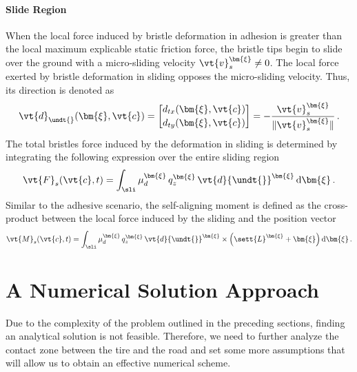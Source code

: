 \paragraph{Slide Region}

When the local force induced by bristle deformation in adhesion is greater than the local maximum explicable static friction force, the bristle tips begin to slide over the ground with a micro-sliding velocity $\vt{v}_s^{\bm{\xi}} \neq 0$. The local force exerted by bristle deformation in sliding opposes the micro-sliding velocity. Thus, its direction is denoted as
%
\begin{equation*}
  \vt{d}_{\undt{}}(\bm{\xi},\vt{c}) =
  \begin{bmatrix}
    d_{tx}(\bm{\xi},\vt{c}) \\[0.2em]
    d_{ty}(\bm{\xi},\vt{c})
  \end{bmatrix} = -\dfrac{\vt{v}_s^{\bm{\xi}}}{\|{\vt{v}_s^{\bm{\xi}}}\|} \, \text{.}
\end{equation*}
%
The total bristles force induced by the deformation in sliding is determined by integrating the following expression over the entire sliding region \sli{}
%
\begin{equation}
  \vt{F}_s(\vt{c},t) = \int_{\sli} \mu_d^{\bm{\xi}}\,q_z^{\bm{\xi}}\,\vt{d}{\undt{}}^{\bm{\xi}} \, \mathrm{d}\bm{\xi} \, \text{.}
  \label{app3:eq:F_s}
\end{equation}
%
Similar to the adhesive scenario, the self-aligning moment is defined as the cross-product between the local force induced by the sliding and the position vector
%
\begin{equation}
  \vt{M}_s(\vt{c},t) = \int_{\sli} \mu_d^{\bm{\xi}}\,q_z^{\bm{\xi}}\,\vt{d}{\undt{}}^{\bm{\xi}} \times \left(\sett{L}^{\bm{\xi}} + \bm{\xi}\right) \mathrm{d}\bm{\xi} \, \text{.}
  \label{app3:eq:M_s}
\end{equation}


\section{A Numerical Solution Approach}
\label{app3:sec:numerical_solution}

Due to the complexity of the problem outlined in the preceding sections, finding an analytical solution is not feasible. Therefore, we need to further analyze the contact zone between the tire and the road and set some more assumptions that will allow us to obtain an effective numerical scheme.

